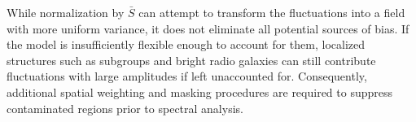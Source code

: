 \pbreak
While normalization by $\bar{S}$ can attempt to transform the fluctuations into a field with more uniform variance, it does not eliminate all potential sources of bias. If the model is insufficiently flexible enough to account for them, localized structures such as subgroups and bright radio galaxies can still contribute fluctuations with large amplitudes if left unaccounted for. Consequently, additional spatial weighting and masking procedures are required to suppress contaminated regions prior to spectral analysis.




